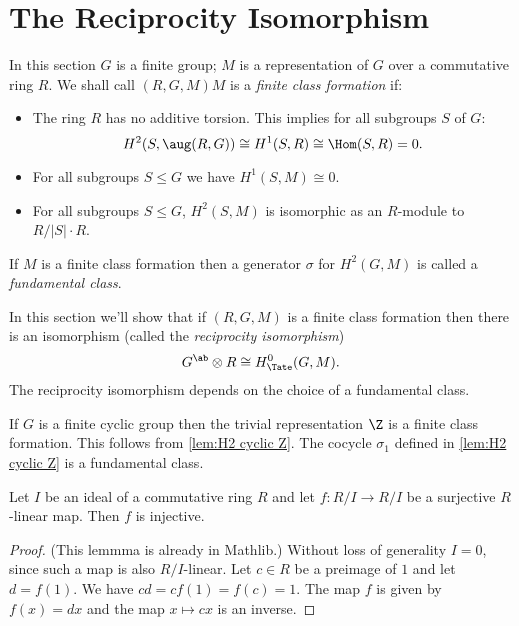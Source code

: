\section{The Reciprocity Isomorphism}

\begin{definition} \label{def:fundamental class}
	In this section $G$ is a finite group; $M$ is a representation of $G$ over a commutative ring $R$.
	We shall call $(R,G,M)M$ is a \emph{finite class formation} if:
	\begin{itemize}
		\item
		The ring $R$ has no additive torsion. This implies for all subgroups $S$ of $G$:
		\[
			H^2(S,\aug(R,G)) \cong H^1(S,R) \cong \Hom(S,R) = 0.
		\]
		\item
		For all subgroups $S \le G$ we have $H^1(S,M) \cong 0$.
		\item
		For all subgroups $S \le G$, $H^2(S,M)$ is isomorphic as an $R$-module to $R / |S| \cdot R$.
	\end{itemize}
	If $M$ is a finite class formation then a generator $\sigma$ for $H^2(G,M)$ is called
	a \emph{fundamental class}.
\end{definition}

In this section we'll show that if $(R,G,M)$ is a finite class formation
then there is an isomorphism (called the \emph{reciprocity isomorphism})
\[
	G^{\ab} \otimes R \cong H^0_{\Tate}(G,M).
\]
The reciprocity isomorphism depends on the choice of a fundamental class.

\begin{example}
	If $G$ is a finite cyclic group then the trivial representation $\Z$
	is a finite class formation.
	This follows from \ref{lem:H2 cyclic Z}.
	The cocycle $\sigma_1$ defined in \ref{lem:H2 cyclic Z} is a fundamental class.
\end{example}

\begin{lemma} \label{lem:linear injective of surjective}
	\mathlibok
	Let $I$ be an ideal of a commutative ring $R$ and let $f:R/I \to R/I$
	be a surjective $R$-linear map.
	Then $f$ is injective.
\end{lemma}

\begin{proof}
	\mathlibok
	(This lemmma is already in Mathlib.)
	Without loss of generality $I=0$, since such a map is also $R/I$-linear.
	Let $c\in R$ be a preimage of $1$ and let $d = f(1)$.
	We have $cd = cf(1) = f(c) = 1$.
	The map $f$ is given by $f(x) = dx$ and the map $x \mapsto cx$ is an inverse.
\end{proof}

